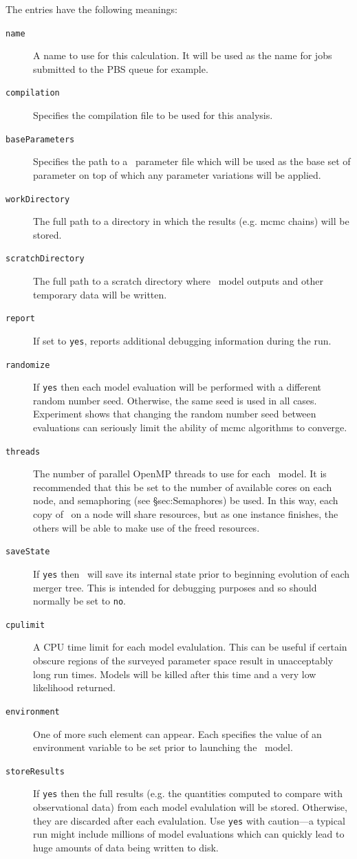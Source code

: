 The entries have the following meanings:
\begin{description}
\item[{\tt name}] A name to use for this calculation. It will be used as the name for jobs submitted to the PBS queue for example.
\item[{\tt compilation}] Specifies the compilation file to be used for this analysis.
\item[{\tt baseParameters}] Specifies the path to a \glc\ parameter file which will be used as the base set of parameter on top of which any parameter variations will be applied.
\item[{\tt workDirectory}] The full path to a directory in which the results (e.g. \gls{mcmc} chains) will be stored.
\item[{\tt scratchDirectory}] The full path to a scratch directory where \glc\ model outputs and other temporary data will be written.
\item[{\tt report}] If set to {\tt yes}, reports additional debugging information during the run.
\item[{\tt randomize}] If {\tt yes} then each model evaluation will be performed with a different random number seed. Otherwise, the same seed is used in all cases. Experiment shows that changing the random number seed between evaluations can seriously limit the ability of \gls{mcmc} algorithms to converge.
\item[{\tt threads}] The number of parallel OpenMP threads to use for each \glc\ model. It is recommended that this be set to the number of available cores on each node, and semaphoring (see \S{sec:Semaphores}) be used. In this way, each copy of \glc\ on a node will share resources, but as one instance finishes, the others will be able to make use of the freed resources.
\item[{\tt saveState}] If {\tt yes} then \glc\ will save its internal state prior to beginning evolution of each merger tree. This is intended for debugging purposes and so should normally be set to {\tt no}.
\item[{\tt cpulimit}] A CPU time limit for each model evalulation. This can be useful if certain obscure regions of the surveyed parameter space result in unacceptably long run times. Models will be killed after this time and a very low likelihood returned.
\item[{\tt environment}] One of more such element can appear. Each specifies the value of an environment variable to be set prior to launching the \glc\ model.
\item[{\tt storeResults}] If {\tt yes} then the full results (e.g. the quantities computed to compare with observational data) from each model evalulation will be stored. Otherwise, they are discarded after each evalulation. Use {\tt yes} with caution---a typical run might include millions of model evaluations which can quickly lead to huge amounts of data being written to disk.
\end{description}

